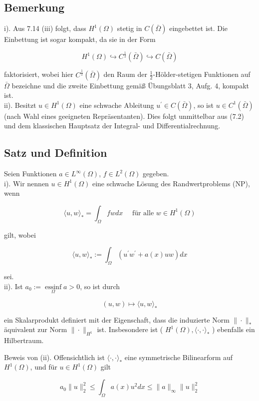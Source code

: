 \documentclass[10pt, letterpaper]{article}
\begin{document}
\subsection*{Bemerkung}
i). Aus 7.14 (iii) folgt, dass $H^{1}(\Omega)$ stetig in $C(\bar{\Omega})$ eingebettet ist. Die Einbettung ist sogar kompakt, da sie in der Form

$$
H^{1}(\Omega) \hookrightarrow C^{\frac{1}{2}}(\bar{\Omega}) \hookrightarrow C(\bar{\Omega})
$$

faktorisiert, wobei hier $C^{\frac{1}{2}}(\bar{\Omega})$ den Raum der $\frac{1}{2}$-Hölder-stetigen Funktionen auf $\bar{\Omega}$ bezeichne und die zweite Einbettung gemäß Übungsblatt 3, Aufg. 4, kompakt ist.\\
ii). Besitzt $u \in H^{1}(\Omega)$ eine schwache Ableitung $u^{\prime} \in C(\bar{\Omega})$, so ist $u \in C^{1}(\bar{\Omega})$ (nach Wahl eines geeigneten Repräsentanten). Dies folgt unmittelbar aus (7.2) und dem klassischen Hauptsatz der Integral- und Differentialrechnung.

\subsection*{Satz und Definition}
Seien Funktionen $a \in L^{\infty}(\Omega)$, $f \in L^{2}(\Omega)$ gegeben.\\
i). Wir nennen $u \in H^{1}(\Omega)$ eine schwache Lösung des Randwertproblems (NP), wenn

$$
\langle u, w\rangle_{*}=\int_{\Omega} f w d x \quad \text { für alle } w \in H^{1}(\Omega)
$$

gilt, wobei

$$
\langle u, w\rangle_{*}:=\int_{\Omega}\left(u^{\prime} w^{\prime}+a(x) u w\right) d x
$$

sei.\\
ii). Ist $a_{0}:=\underset{\Omega}{\operatorname{essinf}} a>0$, so ist durch

$$
(u, w) \mapsto\langle u, w\rangle_{*}
$$

ein Skalarprodukt definiert mit der Eigenschaft, dass die induzierte Norm $\|\cdot\|_{*}$ äquivalent zur Norm $\|\cdot\|_{H^{1}}$ ist. Insbesondere ist ( $H^{1}(\Omega),\langle\cdot, \cdot\rangle_{*}$ ) ebenfalls ein Hilbertraum.

Beweis von (ii). Offensichtlich ist $\langle\cdot, \cdot\rangle_{*}$ eine symmetrische Bilinearform auf $H^{1}(\Omega)$, und für $u \in H^{1}(\Omega)$ gilt

$$
a_{0}\|u\|_{2}^{2} \leq \int_{\Omega} a(x) u^{2} d x \leq\|a\|_{\infty}\|u\|_{2}^{2}
$$
\end{document}
